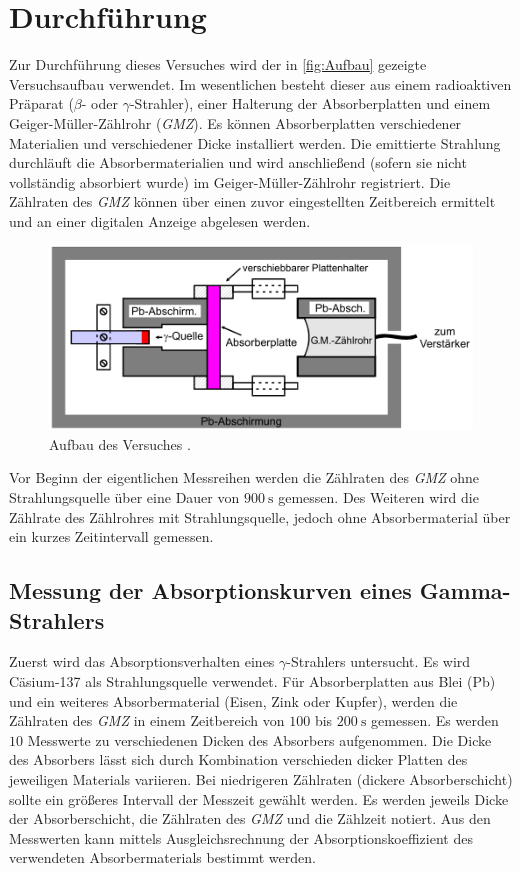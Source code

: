 \section{Durchführung}
\label{sec:Durchführung}
Zur Durchführung dieses Versuches wird der in \autoref{fig:Aufbau} gezeigte Versuchsaufbau verwendet. Im wesentlichen besteht dieser aus einem radioaktiven Präparat
($\beta$- oder $\gamma$-Strahler), einer Halterung der Absorberplatten und einem Geiger-Müller-Zählrohr (\textit{GMZ}). Es können Absorberplatten verschiedener Materialien und verschiedener
Dicke installiert werden.
Die emittierte Strahlung durchläuft die Absorbermaterialien und wird anschließend (sofern sie nicht vollständig absorbiert wurde) im Geiger-Müller-Zählrohr registriert. 
Die Zählraten des \textit{GMZ} können über einen zuvor eingestellten Zeitbereich ermittelt und an einer digitalen Anzeige abgelesen werden.

\begin{figure}
    \centering
    \includegraphics[width = .7\textwidth]{content/Aufbau.png}
    \caption{Aufbau des Versuches \cite{v704}.}
    \label{fig:Aufbau}
\end{figure}

Vor Beginn der eigentlichen Messreihen werden die Zählraten des \textit{GMZ} ohne Strahlungsquelle über eine Dauer von $\qty{900}{\second}$ gemessen. 
Des Weiteren wird die Zählrate des Zählrohres mit Strahlungsquelle, jedoch ohne Absorbermaterial über ein kurzes Zeitintervall gemessen.

\subsection{Messung der Absorptionskurven eines Gamma-Strahlers}
\label{subsec:D_gamma}
Zuerst wird das Absorptionsverhalten eines $\gamma$-Strahlers untersucht. Es wird Cäsium-137 als Strahlungsquelle verwendet. Für Absorberplatten aus Blei (Pb) und ein weiteres
Absorbermaterial (Eisen, Zink oder Kupfer), werden die Zählraten des \textit{GMZ} in einem Zeitbereich von $\num{100}$ bis $\qty{200}{\second}$ gemessen. Es werden 
$10$ Messwerte zu verschiedenen Dicken des Absorbers aufgenommen. Die Dicke des Absorbers lässt sich durch Kombination verschieden dicker Platten des jeweiligen Materials
variieren. Bei niedrigeren Zählraten (dickere Absorberschicht) sollte ein größeres Intervall der Messzeit gewählt werden. Es werden jeweils Dicke der Absorberschicht,
die Zählraten des \textit{GMZ} und die Zählzeit notiert. 
Aus den Messwerten kann mittels Ausgleichsrechnung der Absorptionskoeffizient des verwendeten Absorbermaterials bestimmt werden.

